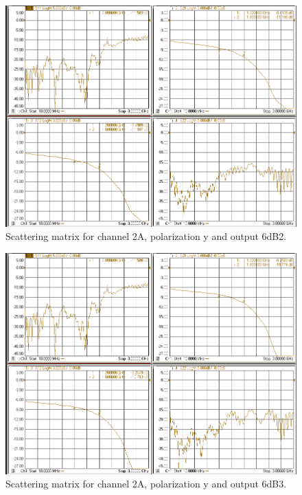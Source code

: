 \documentclass[12pt,a4paper,oneside]{article}
\begin{document}
\begin{figure}[H]
\centering
\includegraphics[width=0.9\linewidth]{VNA_results/2Ay_6dB2.png}
\caption{Scattering matrix for channel 2A, polarization y and output 6dB2.}
\label{fig:2Ay_6dB2}
\end{figure}


\begin{figure}[H]
\centering
\includegraphics[width=0.9\linewidth]{VNA_results/2Ay_6dB3.png}
\caption{Scattering matrix for channel 2A, polarization y and output 6dB3.}
\label{fig:2Ay_6dB3}
\end{figure}
\end{document}
